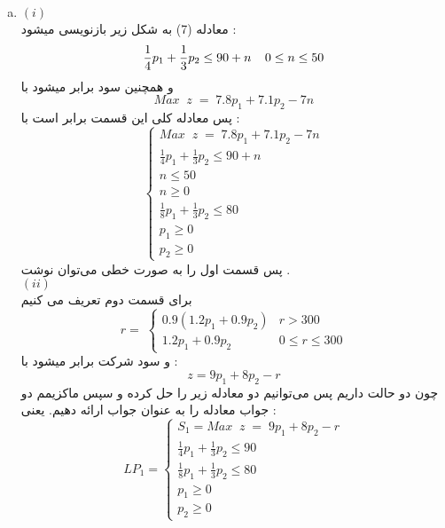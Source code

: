 \documentclass[12pt]{article}
\begin{document}
\begin{enumerate}[(a)]
	\item 
	$(i)$
	\\
	معادله (7) به شکل زیر بازنویسی میشود :
	\\
	\begin{equation}
		\frac{1}{4} p_1 + \frac{1}{3} p_2  \leq  90 +n\\ \;\;\;\;
		0\leq n \leq 50
	\end{equation}
	و همچنین سود برابر میشود با 
	\begin{equation}
		Max \; \; z\; = \; 7.8p_1+7.1p_2-7n
	\end{equation}
	پس معادله کلی این قسمت برابر است با :
	\begin{equation}
		\begin{cases}
			Max \; \; z\; = \; 7.8p_1+7.1p_2-7n
			\\
			\frac{1}{4} p_1 + \frac{1}{3} p_2  \leq  90+n
			\\
			n\leq 50 
			\\
			n\geq 0
			\\
			\frac{1}{8} p_1 + \frac{1}{3} p_2  \leq  80 
			\\
			p_1\geq 0
			\\
			p_2\geq 0
		\end{cases}       
	\end{equation}
	پس قسمت اول را به صورت خطی می‌توان نوشت .
	\\
	$(ii)$
	\\
	برای قسمت دوم تعریف می کنیم 
	\begin{equation}
		r=\;
		\begin{cases}
			0.9(1.2p_1+0.9p_2) &‌ r> 300
			\\
			1.2p_1+0.9p_2  & 0\leq r \leq 300
		\end{cases}       
	\end{equation}
	و سود شرکت برابر میشود با :
	\begin{equation}
		z=9p_1+8p_2-r      
	\end{equation}
	چون دو حالت داریم پس می‌توانیم دو معادله زیر را حل کرده و سپس ماکزیمم دو جواب معادله را به عنوان جواب ارائه دهیم.
	یعنی :
	\begin{equation}
		LP_1=
		\begin{cases}
			S_1=Max \; \; z\;= \; 9p_1+8p_2-r
			\\
			\frac{1}{4} p_1 + \frac{1}{3} p_2  \leq  90
			\\
			\frac{1}{8} p_1 + \frac{1}{3} p_2  \leq  80 
			\\
			p_1\geq 0
			\\
			p_2\geq 0

\end{cases}
\end{equation}
\end{enumerate}
\end{document}
